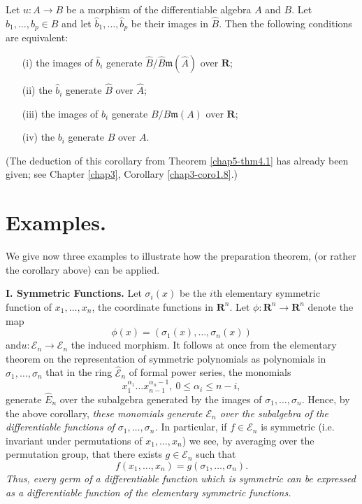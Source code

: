 \begin{corollary}\label{chap5-coro4.4}
  Let $u: A \to B$ be a morphism of the differentiable algebra $A$ and $B$. Let $b_1,\ldots, b_p \in B$ and let $\widehat{b}_1, \ldots, \widehat{b}_p$ be their images in $\widehat{B}$. Then the following conditions are equivalent:
  \begin{itemize}
  \item[(i)] the images of $\widehat{b}_i$ generate $\widehat{B}/\widehat{B} \mathfrak{m}(\widehat{A})$ over $\mathbf{R}$;
    
  \item[(ii)] the $\widehat{b}_i$ generate $\widehat{B}$ over $\widehat{A}$;
    
  \item[(iii)] the images of $b_i$ generate $B/B \mathfrak{m}(A)$ over $\mathbf{R}$;
    
  \item[(iv)] the $b_i$ generate $B$ over $A$.
      \end{itemize}
\end{corollary}
(The deduction of this corollary from Theorem \ref{chap5-thm4.1} has already been given; see Chapter \ref{chap3}, Corollary \ref{chap3-coro1.8}.)

\section[Examples]{Examples.}\label{chap5-sec5}
We give now three examples to illustrate how the preparation theorem, (or rather the corollary above) can be applied.

\medskip
\noindent
\textbf{I. Symmetric Functions.} Let $\sigma_i (x)$ be the $i$th elementary symmetric function of $x_1, \ldots, x_n$, the coordinate functions in $\mathbf{R}^n$. Let $\phi: \mathbf{R}^n \to \mathbf{R}^n$ denote the map
$$
\phi (x) = (\sigma_1 (x), \ldots, \sigma_n (x))
$$
and\pageoriginale $u : \mathscr{E}_n \to \mathscr{E}_n$ the induced morphism. It follows at once from the elementary theorem on the representation of symmetric polynomials as polynomials in $\sigma_1, \ldots, \sigma_n$ that in the ring $\widehat{\mathscr{E}}_n$ of formal power series, the monomials
$$
x^{\alpha_1}_1 \ldots x^{\alpha_n - 1}_{n-1}, ~ 0 \leq \alpha_i \leq n - i,
$$
generate $\widehat{E}_n$ over the subalgebra generated by the images of $\sigma_1, \ldots , \sigma_n$. Hence, by the above corollary, \textit{these monomials generate $\mathscr{E}_n$ over the subalgebra of the differentiable functions of $\sigma_1, \ldots, \sigma_n$.} In particular, if $f \in \mathscr{E}_n$ is symmetric (i.e. invariant under permutations of $x_1, \ldots, x_n$) we see, by averaging over the permutation group, that there exists $g \in \mathscr{E}_n$ such that
$$
f(x_1, \ldots, x_n) = g(\sigma_1, \ldots, \sigma_n).
$$
\textit{Thus, every germ of a differentiable function which is symmetric can be expressed as a differentiable function of the elementary symmetric functions.}

